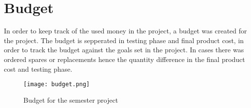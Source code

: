 \documentclass[12pt]{article}
\begin{document}
\section{Budget}

In order to keep track of the used money in the project, a budget was created for the project. The budget is sepperated in testing phase and final product cost, in order to track the budget against the goals set in the project. In cases there was ordered spares or replacements hence the quantity difference in the final product cost and testing phase. 

\begin{figure}[H]
    \begin{center}
    \texttt{[image: budget.png]}
    \end{center}
    \caption{Budget for the semester project}
    \label{fig:Surge_Current}
\end{figure}
\end{document}
